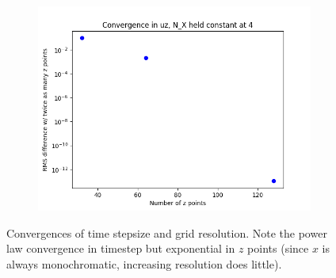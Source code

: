 \documentclass[dvipsnames]{beamer}
\begin{document}
\begin{frame}
\begin{figure}[!h]
        \begin{subfigure}{0.3\textwidth}
            \centering
            \includegraphics[width=\textwidth]{../sims/2d_strat_conv/z_conv.png}
        \end{subfigure}
        \caption{Convergences of time stepsize and grid resolution. Note the
        power law convergence in timestep but exponential in $z$ points (since
        $x$ is always monochromatic, increasing resolution does little).}\label{fig:convsv}
    \end{figure}
\end{frame}
\end{document}
